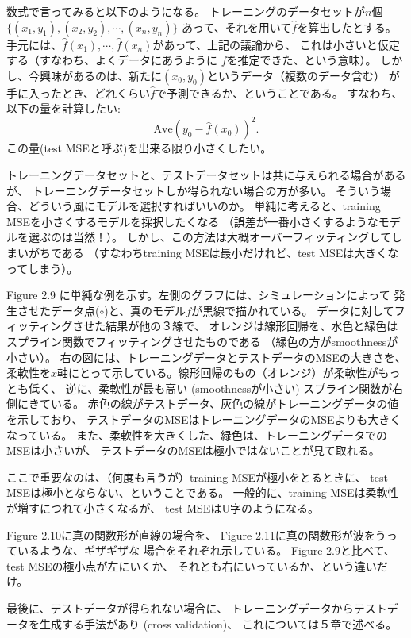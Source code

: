 \documentclass{jsbook}
\begin{document}
数式で言ってみると以下のようになる。
トレーニングのデータセットが$n$個$\{(x_1, y_1), (x_2, y_2), \cdots, (x_n, y_n) \}$
あって、それを用いて$\hat{f}$を算出したとする。
手元には、$\hat{f}(x_1), \cdots, \hat{f}(x_n)$があって、上記の議論から、
これは小さいと仮定する（すなわち、よくデータにあうように
$f$を推定できた、という意味）。
しかし、今興味があるのは、新たに$(x_0, y_0)$というデータ（複数のデータ含む）
が手に入ったとき、どれくらい$\hat{f}$で予測できるか、ということである。
すなわち、以下の量を計算したい:
\begin{equation}
	\text{Ave}(y_0 - \hat{f}(x_0))^2.
\end{equation}
この量(test MSEと呼ぶ)を出来る限り小さくしたい。

トレーニングデータセットと、テストデータセットは共に与えられる場合があるが、
トレーニングデータセットしか得られない場合の方が多い。
そういう場合、どういう風にモデルを選択すればいいのか。
単純に考えると、training MSEを小さくするモデルを採択したくなる
（誤差が一番小さくするようなモデルを選ぶのは当然！）。
しかし、この方法は大概オーバーフィッティングしてしまいがちである
（すなわちtraining MSEは最小だけれど、test MSEは大きくなってしまう）。

Figure 2.9 に単純な例を示す。左側のグラフには、シミュレーションによって
発生させたデータ点($\circ$)と、真のモデル$f$が黒線で描かれている。
データに対してフィッティングさせた結果が他の３線で、
オレンジは線形回帰を、水色と緑色はスプライン関数でフィッティングさせたものである
（緑色の方がsmoothnessが小さい）。
右の図には、トレーニングデータとテストデータのMSEの大きさを、
柔軟性を$x$軸にとって示している。線形回帰のもの（オレンジ）が柔軟性がもっとも低く、
逆に、柔軟性が最も高い (smoothnessが小さい) スプライン関数が右側にきている。
赤色の線がテストデータ、灰色の線がトレーニングデータの値を示しており、
テストデータのMSEはトレーニングデータのMSEよりも大きくなっている。
また、柔軟性を大きくした、緑色は、トレーニングデータでのMSEは小さいが、
テストデータのMSEは極小ではないことが見て取れる。

ここで重要なのは、（何度も言うが）training MSEが極小をとるときに、
test MSEは極小とならない、ということである。
一般的に、training MSEは柔軟性が増すにつれて小さくなるが、
test MSEはU字のようになる。

Figure 2.10に真の関数形が直線の場合を、
Figure 2.11に真の関数形が波をうっているような、ギザギザな
場合をそれぞれ示している。
Figure 2.9と比べて、test MSEの極小点が左にいくか、
それとも右にいっているか、という違いだけ。

最後に、テストデータが得られない場合に、
トレーニングデータからテストデータを生成する手法があり (cross validation)、
これについては５章で述べる。
\end{document}
